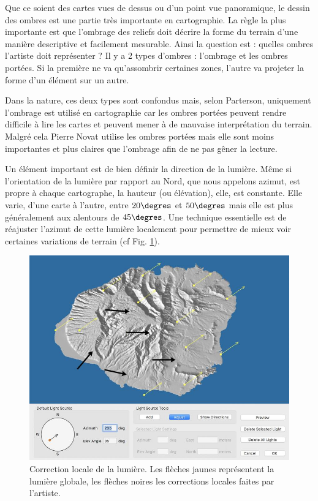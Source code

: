 Que ce soient des cartes vues de dessus ou d'un point vue panoramique, le dessin des ombres est une partie très importante en cartographie. La règle la plus importante est que l'ombrage des reliefs doit décrire la forme du terrain d'une manière descriptive et facilement mesurable. Ainsi la question est : quelles ombres l'artiste doit représenter ? Il y a 2 types d'ombres : l'ombrage et les ombres portées. Si la première ne va qu'assombrir certaines zones, l'autre va projeter la forme d'un élément sur un autre.

Dans la nature, ces deux types sont confondus mais, selon Parterson, uniquement l'ombrage est utilisé en cartographie car les ombres portées peuvent rendre difficile à lire les cartes et peuvent mener à de mauvaise interprétation du terrain. Malgré cela Pierre Novat utilise les ombres portées mais elle sont moins importantes et plus claires que l'ombrage afin de ne pas gêner la lecture. 

Un élément important est de bien définir la direction de la lumière. Même si l'orientation de la lumière par rapport au Nord, que nous appelons azimut, est propre à chaque cartographe, la hauteur (ou élévation), elle, est constante. Elle varie, d'une carte à l'autre, entre $20\degres$ et $50\degres$ mais elle est plus généralement aux alentours de $45\degres$. Une technique essentielle est de réajuster l'azimut de cette lumière localement pour permettre de mieux voir certaines variations de terrain (cf Fig. \ref{fig:corretionLumière}). 


\begin{figure}[!t]
	\centering
 	\includegraphics[width=0.7\linewidth]{Etat_de_l_art/multiple_light.jpeg}
 	\caption{\label{fig:corretionLumière}Correction locale de la lumière. Les flèches jaunes représentent la lumière globale, les flèches noires les corrections locales faites par l'artiste.}
\end{figure}

